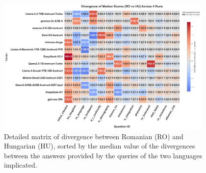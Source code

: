 \documentclass[11pt]{article}
\begin{document}
\begin{figure}[htbp]
    \centering
    \includegraphics[width=0.95\textwidth]{../analysis_reports/consistency_scale_hu.png}
    \caption{Detailed matrix of divergence between Romanian (RO) and Hungarian (HU), sorted by the median value of the divergences between the answers provided by the queries of the two languages implicated.}
    \label{fig:model_scale_consistency_hu}
\end{figure}


\FloatBarrier
\end{document}
